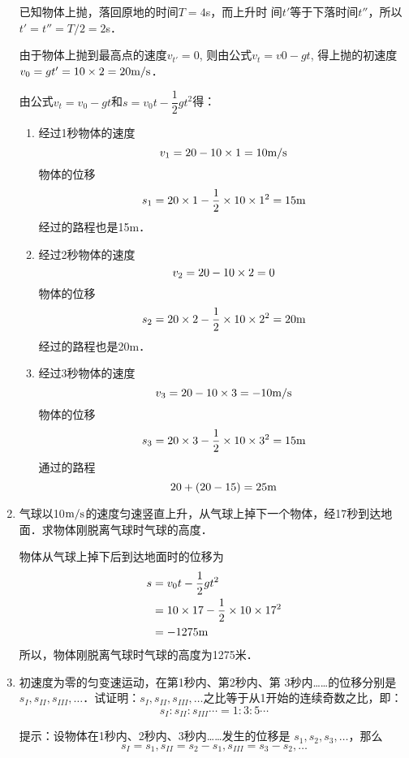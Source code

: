 \begin{enumerate}
    \begin{solution}
已知物体上抛，落回原地的时间$T=4$s，而上升时
间$t'$等于下落时间$t''$，所以$t'=t''=T/2=2$s．

由于物体上抛到最高点的速度$v_{t'}=0$, 则由公式$v_t=v0
-gt$, 得上抛的初速度$v_0=gt'=10\times2=20\text{m}/\text{s}$．

由公式$v_t=v_0-gt$和$s=v_0t-\dfrac{1}{2}gt^2$得：
\begin{enumerate}
    \item 经过1秒物体的速度
    $$v_1=20-10\times1=10\text{m}/\text{s}$$
    物体的位移
    $$s_1=20\times1-\frac{1}{2}\times 10\times1^2=15{\rm m}$$
    经过的路程也是15m．
\item 经过2秒物体的速度
\[v_2=20-10\times2=0\]
物体的位移
\[s_2=20\times 2-\frac{1}{2}\times 10\times 2^2=20{\rm m}\]
经过的路程也是20m．
\item 经过3秒物体的速度
\[v_3=20-10\times3=-10\text{m}/\text{s}\]
物体的位移
\[s_3=20\times3-\frac{1}{2}\times 10\times3^2=15{\rm m}\]
通过的路程
\[20+(20-15)=25{\rm m}\]
\end{enumerate}

    \end{solution}
	\item 气球以10$\text{m}/\text{s}$的速度匀速竖直上升，从气球上掉下一个物体，经17秒到达地面．求物体刚脱离气球时气球的高度．

    \begin{solution}
        物体从气球上掉下后到达地面时的位移为
\[\begin{split}
    s&=v_0t-\frac{1}{2}gt^2\\
    &=10\times 17-\frac{1}{2}\times 10\times 17^2\\
    &=-1275{\rm m}
\end{split}\]
所以，物体刚脱离气球时气球的高度为1275米．
    \end{solution}
	\item 初速度为零的匀变速运动，在第1秒内、第2秒内、第
	3秒内……的位移分别是$s_I,s_{II},s_{III},\ldots$．试证明：$s_I,s_{II},s_{III},\ldots$之比等于从1开始的连续奇数之比，即：
$$s_I:s_{II}:s_{III}\cdots=1:3:5\cdots$$

提示：设物体在1秒内、2秒内、3秒内……发生的位移是
$s_1,s_2,s_3,\ldots$，那么
$$s_I=s_1, s_{II}=s_2-s_1, s_{III}=s_3-s_2,\ldots$$


\end{enumerate}
